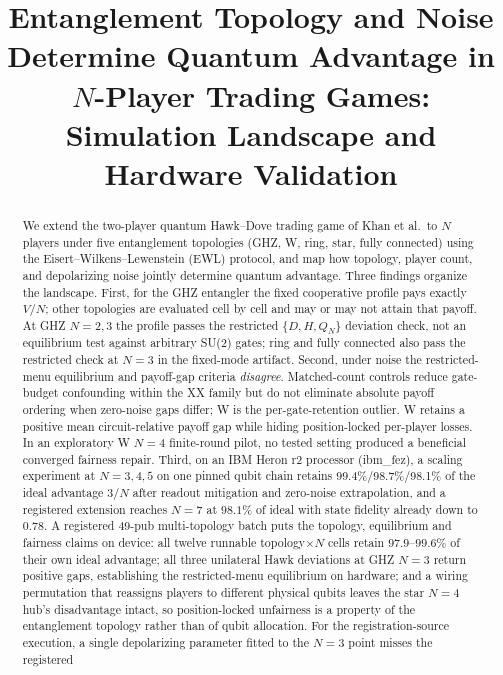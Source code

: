 \documentclass[conference]{IEEEtran}
\title{Entanglement Topology and Noise Determine Quantum Advantage in
$N$-Player Trading Games:\\ Simulation Landscape and Hardware Validation}
\author{%
\IEEEauthorblockN{Prithvi Raghu}
\IEEEauthorblockA{VIT Vellore\\prithviraghu080706@gmail.com}
\and
\IEEEauthorblockN{Aasa Singh Bhui}
\IEEEauthorblockA{VIT Vellore\\aasasingh2005@gmail.com}
}
\begin{document}
\maketitle

\begin{abstract}
We extend the two-player quantum Hawk--Dove trading game of Khan et al.\ to
$N$ players under five entanglement topologies (GHZ, W, ring, star,
fully connected) using the Eisert--Wilkens--Lewenstein (EWL) protocol, and map
how topology, player count, and depolarizing noise jointly determine quantum
advantage. Three findings organize the landscape. First, for the GHZ
entangler the fixed cooperative profile pays exactly $V/N$; other topologies
are evaluated cell by cell and may or may not attain that payoff. At GHZ
$N{=}2,3$ the profile passes the restricted $\{D,H,Q_N\}$ deviation check,
not an equilibrium test against arbitrary SU(2) gates; ring and fully
connected also pass the restricted check at $N{=}3$ in the fixed-mode
artifact. Second, under noise the restricted-menu equilibrium and payoff-gap
criteria \emph{disagree}. Matched-count controls reduce gate-budget confounding
within the XX family but do not eliminate absolute payoff ordering when
zero-noise gaps differ; W is the per-gate-retention outlier. W retains a
positive mean circuit-relative payoff gap while hiding position-locked
per-player losses. In an exploratory W $N{=}4$ finite-round pilot, no tested
setting produced a beneficial converged fairness repair. Third, on an IBM Heron r2 processor
(ibm\_fez), a scaling
experiment at $N=3,4,5$ on one pinned qubit chain retains
99.4\%/98.7\%/98.1\% of the ideal advantage $3/N$ after readout mitigation and
zero-noise extrapolation, and a registered extension reaches $N{=}7$ at
$98.1\%$ of ideal with state fidelity already down to $0.78$. A registered
49-pub multi-topology batch puts the topology, equilibrium and fairness claims
on device: all twelve runnable topology$\times N$ cells retain
$97.9$--$99.6\%$ of their own ideal advantage; all three unilateral Hawk
deviations at GHZ $N{=}3$ return positive gaps, establishing the
restricted-menu equilibrium on hardware; and a wiring permutation that
reassigns players to different physical qubits leaves the star $N{=}4$ hub's
disadvantage intact, so position-locked unfairness is a property of the
entanglement topology rather than of qubit allocation. For the registration-source execution, a single
depolarizing parameter fitted to the $N{=}3$ point misses the registered

\end{abstract}
\end{document}
